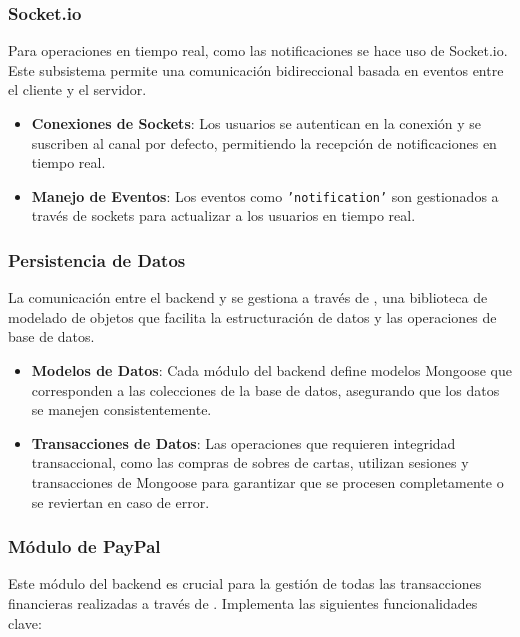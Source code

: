 \subsubsection{Socket.io}
Para operaciones en tiempo real, como las notificaciones se hace uso de Socket.io. Este subsistema permite una comunicación bidireccional basada en eventos entre el cliente y el servidor.

\begin{itemize}
    \item \textbf{Conexiones de Sockets}: Los usuarios se autentican en la conexión y se suscriben al canal por defecto, permitiendo la recepción de notificaciones en tiempo real.
    \item \textbf{Manejo de Eventos}: Los eventos como \texttt{'notification'} son gestionados a través de sockets para actualizar a los usuarios en tiempo real.
\end{itemize}

\subsubsection{Persistencia de Datos}
La comunicación entre el backend y  se gestiona a través de  , una biblioteca de modelado de objetos que facilita la estructuración de datos y las operaciones de base de datos.

\begin{itemize}
    \item \textbf{Modelos de Datos}: Cada módulo del backend define modelos Mongoose que corresponden a las colecciones de la base de datos, asegurando que los datos se manejen consistentemente.
    \item \textbf{Transacciones de Datos}: Las operaciones que requieren integridad transaccional, como las compras de sobres de cartas, utilizan sesiones y transacciones de Mongoose para garantizar que se procesen completamente o se reviertan en caso de error.
\end{itemize}

\subsubsection{Módulo de PayPal}
Este módulo del backend es crucial para la gestión de todas las transacciones financieras realizadas a través de . Implementa las siguientes funcionalidades clave:

